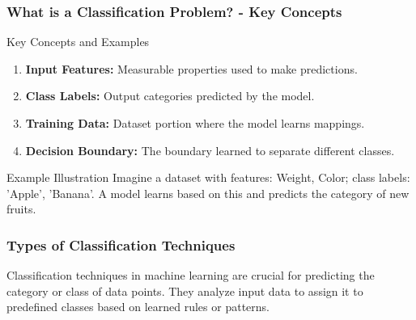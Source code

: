 \documentclass[aspectratio=169]{beamer}
\begin{document}
\begin{frame}[fragile]
    \frametitle{What is a Classification Problem? - Key Concepts}
    \begin{block}{Key Concepts and Examples}
        \begin{enumerate}
            \item \textbf{Input Features:} Measurable properties used to make predictions.
            \item \textbf{Class Labels:} Output categories predicted by the model.
            \item \textbf{Training Data:} Dataset portion where the model learns mappings.
            \item \textbf{Decision Boundary:} The boundary learned to separate different classes.
        \end{enumerate}
    \end{block}
    
    \begin{block}{Example Illustration}
        Imagine a dataset with features: Weight, Color; class labels: 'Apple', 'Banana'.
        A model learns based on this and predicts the category of new fruits.
    \end{block}
\end{frame}

\begin{frame}[fragile]
    \frametitle{Types of Classification Techniques}
    Classification techniques in machine learning are crucial for predicting the category or class of data points. They analyze input data to assign it to predefined classes based on learned rules or patterns.
\end{frame}
\end{document}
